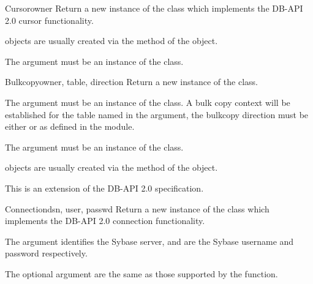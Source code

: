 \begin{classdesc}{Cursor}{owner}
Return a new instance of the  class which implements the
DB-API 2.0 cursor functionality.

 objects are usually created via the
 method of the  object.

The  argument must be an instance of the 
class.
\end{classdesc}

\begin{classdesc}{Bulkcopy}{owner, table, direction}
Return a new instance of the  class.

The  argument must be an instance of the 
class.  A bulk copy context will be established for the table named in
the  argument, the bulkcopy direction must be either
 or  as defined in the
 module.

The  argument must be an instance of the 
class.

 objects are usually created via the
 method of the  object.

This is an extension of the DB-API 2.0 specification.
\end{classdesc}

\begin{classdesc}{Connection}{dsn, user, passwd \optional{, \ldots}}
Return a new instance of the  class which implements
the DB-API 2.0 connection functionality.

The  argument identifies the Sybase server,  and
 are the Sybase username and password respectively.

The optional argument are the same as those supported by the
 function.
\end{classdesc}

